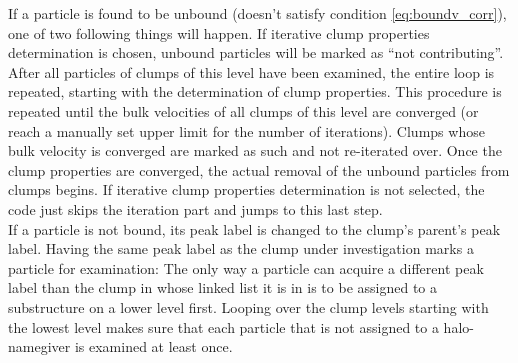 If a particle is found to be unbound (doesn't satisfy condition \eqref{eq:boundv_corr}), one of two following things will happen.
If iterative clump properties determination is chosen, unbound particles will be marked as ``not contributing''.
After all particles of clumps of this level have been examined, the entire loop is repeated, starting with the determination of clump properties.
This procedure is repeated until the bulk velocities of all clumps of this level are converged (or reach a manually set upper limit for the number of iterations).
Clumps whose bulk velocity is converged are marked as such and not re-iterated over.
Once the clump properties are converged, the actual removal of the unbound particles from clumps begins.
If iterative clump properties determination is not selected, the code just skips the iteration part and jumps to this last step.\\
If a particle is not bound, its peak label is changed to the clump's parent's peak label.
Having the same peak label as the clump under investigation marks a particle for examination:
The only way a particle can acquire a different peak label than the clump in whose linked list it is in is to be assigned to a substructure on a lower level first.
Looping over the clump levels starting with the lowest level makes sure that each particle that is not assigned to a halo-namegiver is examined at least once.




